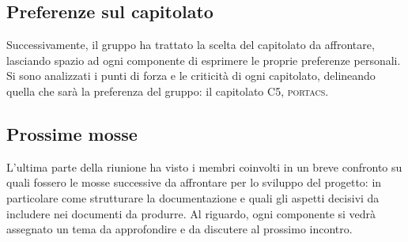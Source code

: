 \subsection{Preferenze sul capitolato}
Successivamente, il gruppo ha trattato la scelta del capitolato da affrontare, lasciando spazio ad ogni componente di esprimere le proprie preferenze personali. Si sono analizzati i punti di forza e le criticità di ogni capitolato, delineando quella che sarà la preferenza del gruppo: il capitolato C5, \textsc{portacs}.

\subsection{Prossime mosse}
L'ultima parte della riunione ha visto i membri coinvolti in un breve confronto su quali fossero le mosse successive da affrontare per lo sviluppo del progetto: in particolare come strutturare la documentazione e quali gli aspetti decisivi da includere nei documenti da produrre. Al riguardo, ogni componente si vedrà assegnato un tema da approfondire e da discutere al prossimo incontro.






